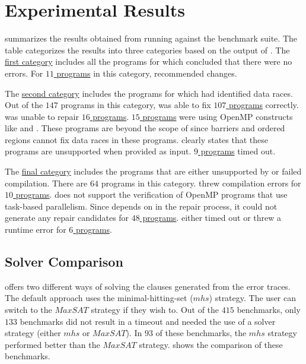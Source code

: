 \section{Experimental Results}
 summarizes the results obtained from running \tool against the benchmark suite. The table categorizes the results into three categories based on the output of \verifier. The \hyperlink{racefree}{first category} includes all the programs for which \verifier concluded that there were no errors. For \hyperlink{racefree_changes}{$11$ programs} in this category, \tool recommended changes.

The \hyperlink{racedetected}{second category} includes the programs for which \verifier had identified data races. Out of the $147$ programs in this category, \tool was able to fix \hyperlink{repaired}{$107$ programs} correctly. \tool was unable to repair \hyperlink{repairerror}{$16$ programs}. \hyperlink{unsupported}{$15$ programs} were using OpenMP constructs like  and . These programs are beyond the scope of \tool since barriers and ordered regions cannot fix data races in these programs. \tool clearly states that these programs are unsupported when provided as input. \hyperlink{timedout}{$9$ programs} timed out.

The \hyperlink{llovunsupported}{final category} includes the programs that are either unsupported by \verifier or failed compilation. There are $64$ programs in this category. \verifier threw compilation errors for \hyperlink{compileerror}{$10$ programs}. \verifier does not support the verification of OpenMP programs that use task-based parallelism. Since \tool depends on \verifier in the repair process, it could not generate any repair candidates for \hyperlink{llorunsupported}{$48$ programs}. \verifier either timed out or threw a runtime error for \hyperlink{verifyerror}{$6$ programs}.
 


\subsection{Solver Comparison}

\tool offers two different ways of solving the clauses generated from the error traces. The default approach uses the minimal-hitting-set ($mhs$) strategy. The user can switch to the $MaxSAT$ strategy if they wish to. Out of the $415$ benchmarks, only $133$ benchmarks did not result in a timeout and needed the use of a solver strategy (either $mhs$ or $MaxSAT$). In $93$ of these benchmarks, the $mhs$ strategy performed better than the $MaxSAT$ strategy.  shows the comparison of these benchmarks.


